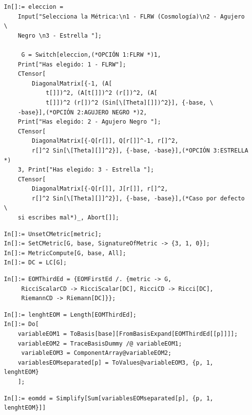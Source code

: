 \documentclass[12pt]{book}
\begin{document}
\begin{lstlisting}[caption={Métrica para xCoba}, label={lst:automatizacion-metrica-xcoba}]
In[]:= eleccion = 
    Input["Selecciona la Métrica:\n1 - FLRW (Cosmología)\n2 - Agujero \
    Negro \n3 - Estrella "];

     G = Switch[eleccion,(*OPCIÓN 1:FLRW *)1, 
    Print["Has elegido: 1 - FLRW"];
    CTensor[
        DiagonalMatrix[{-1, (A[
            t[]])^2, (A[t[]])^2 (r[])^2, (A[
            t[]])^2 (r[])^2 (Sin[\[Theta][]])^2}], {-base, \
    -base}],(*OPCIÓN 2:AGUJERO NEGRO *)2, 
    Print["Has elegido: 2 - Agujero Negro "];
    CTensor[
        DiagonalMatrix[{-Q[r[]], Q[r[]]^-1, r[]^2, 
        r[]^2 Sin[\[Theta][]]^2}], {-base, -base}],(*OPCIÓN 3:ESTRELLA *)
    3, Print["Has elegido: 3 - Estrella "];
    CTensor[
        DiagonalMatrix[{-Q[r[]], J[r[]], r[]^2, 
        r[]^2 Sin[\[Theta][]]^2}], {-base, -base}],(*Caso por defecto \
    si escribes mal*)_, Abort[]];
\end{lstlisting}



\begin{lstlisting}[caption={Cambiando la métrica para xCoba}]
In[]:= UnsetCMetric[metric];
In[]:= SetCMetric[G, base, SignatureOfMetric -> {3, 1, 0}]; 
In[]:= MetricCompute[G, base, All];
In[]:= DC = LC[G]; 
\end{lstlisting}


\begin{lstlisting}[caption={Cambiando los tensores de xTensor a xCoba}]
In[]:= EOMThirdEd = {EOMFirstEd /. {metric -> G, 
     RicciScalarCD -> RicciScalar[DC], RicciCD -> Ricci[DC], 
     RiemannCD -> Riemann[DC]}}; 
\end{lstlisting}


\begin{lstlisting}[caption={Cambiando del lenguaje de xCoba a Mathematica nativo}]
In[]:= lenghtEOM = Length[EOMThirdEd];
In[]:= Do[
    variableEOM1 = ToBasis[base][FromBasisExpand[EOMThirdEd[[p]]]];
    variableEOM2 = TraceBasisDummy /@ variableEOM1;
     variableEOM3 = ComponentArray@variableEOM2;
    variablesEOMseparated[p] = ToValues@variableEOM3, {p, 1, lenghtEOM}
    ];
\end{lstlisting}
 

\begin{lstlisting}[caption={EOM $\mathcal{E}_{ab}$}]
In[]:= eomdd = Simplify[Sum[variablesEOMseparated[p], {p, 1, lenghtEOM}]]
\end{lstlisting}
\end{document}
